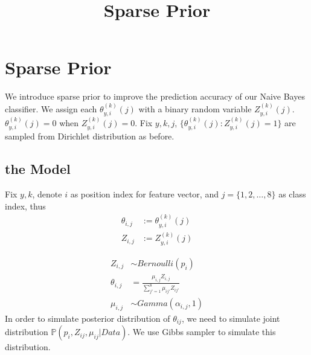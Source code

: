 \documentclass[12pt]{article}
\title{Sparse Prior}
\begin{document}
\maketitle

\section{Sparse Prior}
We introduce sparse prior to improve the prediction accuracy of our Naive Bayes classifier. We assign each $\theta_{y,i}^{(k)}(j)$ with a binary random variable $Z_{y,i}^{(k)}(j)$. $\theta_{y,i}^{(k)}(j)=0$ when $Z_{y,i}^{(k)}(j)=0$. Fix $y,k,j$, $\{\theta_{y,i}^{(k)}(j):Z_{y,i}^{(k)}(j)=1\}$ are sampled from Dirichlet distribution as before.

\subsection{the Model}
Fix $y,k$, denote $i$ as position index for feature vector, and $j = \{1,2, \ldots,8\} $ as class index, thus
\begin{align*}
\theta_{i,j} &:= \theta_{y,i}^{(k)}(j) \\
Z_{i,j} &:= Z_{y,i}^{(k)}(j)
\end{align*}

\begin{align*}
Z_{i,j} &\sim Bernoulli (p_i) \\
\theta_{i,j} &= \frac{\mu_{i,j} Z_{i,j}}{\sum_{j'=1}^8 \mu_{ij'} Z_{ij'}} \\
\mu_{i,j} &\sim Gamma(\alpha_{i,j},1)
\end{align*}
In order to simulate posterior distribution of $\theta_{ij}$, we need to simulate joint distribution $\mathbb{P} (p_i, Z_{ij}, \mu_{ij} | Data)$. We use Gibbs sampler to simulate this distribution.
\end{document}
